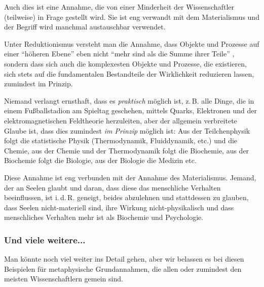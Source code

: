 Auch dies ist eine Annahme, die von einer Minderheit der Wissenschaftler (teilweise) in Frage gestellt wird. Sie ist eng verwandt mit dem Materialismus und der Begriff wird manchmal austauschbar verwendet.

Unter Reduktionismus versteht man die Annahme, dass Objekte und Prozesse auf einer \enquote{höheren Ebene} eben nicht
\enquote{mehr sind als die Summe ihrer Teile}
, sondern dass sich auch die komplexesten Objekte und Prozesse, die existieren, sich stets auf die fundamentalen
Bestandteile der Wirklichkeit reduzieren lassen, zumindest im Prinzip.

Niemand verlangt ernsthaft, dass es \emph{praktisch}
möglich ist, z.\,B. alle Dinge, die in einem Fußballstadion am Spieltag geschehen, mittels Quarks, Elektronen und der
elektromagnetischen Feldtheorie herzuleiten, aber der allgemein verbreitete Glaube ist, dass dies zumindest
\emph{im Prinzip} möglich ist: Aus der Teilchenphysik folgt die statistische Physik (Thermodynamik, Fluiddynamik, etc.) und die Chemie, aus der Chemie und der Thermodynamik folgt die Biochemie, aus der Biochemie folgt die Biologie, aus der Biologie die Medizin etc.

Diese Annahme ist eng verbunden mit der Annahme des Materialismus. Jemand, der an Seelen glaubt und daran, dass diese das menschliche Verhalten beeinflussen, ist i.\,d.\,R. geneigt, beides abzulehnen und stattdessen zu glauben, dass Seelen nicht-materiell sind, ihre Wirkung nicht-physikalisch und dass menschliches Verhalten mehr ist als Biochemie und Psychologie.

\subsubsection{Und viele weitere...}

Man könnte noch viel weiter ins Detail gehen, aber wir belassen es bei diesen Beispielen für metaphysische Grundannahmen, die allen oder zumindest den meisten Wissenschaftlern gemein sind.
